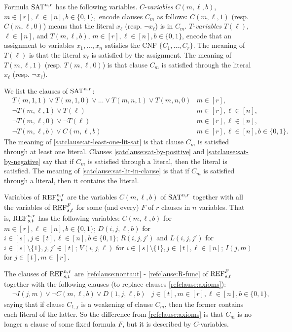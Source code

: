 \documentclass[10pt,a4paper]{article}
\theoremstyle{remark}
\newtheorem*{switching lemma}{Switching Lemma}
\newtheorem*{open problem}{Open Problem}
\theoremstyle{definition}
\begin{document}
Formula $\textnormal{SAT}^{n,r}$ has the following variables. $C$-\emph{variables} $C(m,\ell,b)$, $m \in [r], \ell \in [n], b \in \{0,1\},$ encode clauses $C_m$ as follows: $C(m,\ell,1)$ (resp. $C(m,\ell,0)$) means that the literal $x_\ell$ (resp. $\neg x_\ell$) is in $C_m$. 
$T$-\emph{variables} $T(\ell)$, $\ell \in [n]$, and $T(m,\ell,b)$, $m \in [r], \ell \in [n], b \in \{0,1\}$, encode that an assignment to variables $x_1,\ldots, x_n$ satisfies the CNF $\{C_1,\ldots, C_r\}$. The meaning of $T(\ell)$ is that the literal $x_\ell$ is satisfied by the assignment. The meaning of $T(m,\ell,1)$ (resp. $T(m,\ell,0)$) is that clause $C_m$ is satisfied through the literal $x_\ell$ (resp. $\neg x_\ell$).

We list the clauses of $\textnormal{SAT}^{n,r}$:
\begin{align}
\label{satclause:at-least-one-lit-sat} & T(m,1,1) \lor T(m,1,0) \lor \ldots \lor T(m,n,1) \lor T(m,n,0)& m \in [r],\\
\label{satclause:sat-by-positive} & \neg T(m,\ell,1) \lor T(\ell) & m \in [r], \ell \in [n],\\
\label{satclause:sat-by-negative} & \neg T(m,\ell,0) \lor \neg T(\ell) & m \in [r], \ell \in [n],\\
\label{satclause:sat-lit-in-clause} & \neg T(m,\ell,b) \lor C(m,\ell,b) & m \in [r], \ell \in [n], b \in \{0,1\}.
\end{align}
The meaning of \eqref{satclause:at-least-one-lit-sat} is that clause $C_m$ is satisfied through at least one literal.
Clauses \eqref{satclause:sat-by-positive} and \eqref{satclause:sat-by-negative} say that if $C_m$ is satisfied through a literal, then the literal is satisfied.
The meaning of \eqref{satclause:sat-lit-in-clause} is that if $C_m$ is satisfied through a literal, then it contains the literal. 

Variables of $\textnormal{REF}^{n,r}_{s,t}$ are the variables $C(m,\ell,b)$ of $\textnormal{SAT}^{n,r}$ together with all the variables of $\textnormal{REF}^F_{s,t}$ for some (and every) $F$ of $r$ clauses in $n$ variables. That is, $\textnormal{REF}^{n,r}_{s,t}$ has the following variables:
$C(m,\ell,b)$ for $m \in [r], \ell \in [n], b \in \{0,1\}$;
$D(i,j,\ell,b)$ for $i \in [s], j \in [t], \ell \in [n], b \in \{0,1\}$; 
$R(i,j,j')$ and $L(i,j,j')$ for $i \! \in \! [s] \! \setminus \! \{1\}, j,j' \in [t]$; $V(i,j,\ell)$ for $i \! \in \! [s] \! \setminus \! \{1\}, j \in [t], \ell \in [n]$; $I(j,m)$ for $j \in [t], m \in [r]$.

The clauses of $\textnormal{REF}^{n,r}_{s,t}$ are 
\eqref{refclause:nontaut} - \eqref{refclause:R-func} of  $\textnormal{REF}^F_{s,t}$ together with the following clauses (to replace clauses \eqref{refclause:axioms}): 
\begin{align}
\label{refclause-n-r:axioms}
& \neg I(j,m) \lor \neg C(m,\ell,b) \lor D(1,j,\ell,b) &  j \in [t], m \in [r], \ell \in [n], b \in \{0,1\},
\end{align}
saying that if clause $C_{1,j}$ is a weakening of clause $C_m$, then the former contains each literal of the latter. So the difference from \eqref{refclause:axioms} is that $C_m$ is no longer a clause of some fixed formula $F$, but it is described by $C$-variables.
\end{document}
